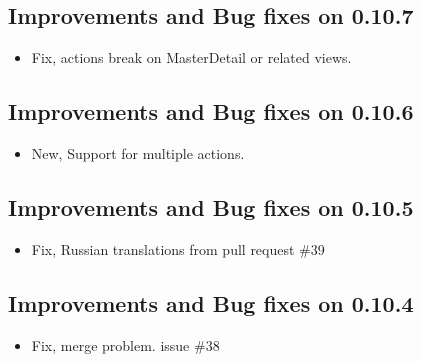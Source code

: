 \documentclass[letterpaper,10pt,english]{sphinxmanual}
\begin{document}
\subsection{Improvements and Bug fixes on 0.10.7}
\label{versions:improvements-and-bug-fixes-on-0-10-7}\begin{itemize}
\item {} 
Fix, actions break on MasterDetail or related views.

\end{itemize}


\subsection{Improvements and Bug fixes on 0.10.6}
\label{versions:improvements-and-bug-fixes-on-0-10-6}\begin{itemize}
\item {} 
New, Support for multiple actions.

\end{itemize}


\subsection{Improvements and Bug fixes on 0.10.5}
\label{versions:improvements-and-bug-fixes-on-0-10-5}\begin{itemize}
\item {} 
Fix, Russian translations from pull request \#39

\end{itemize}


\subsection{Improvements and Bug fixes on 0.10.4}
\label{versions:improvements-and-bug-fixes-on-0-10-4}\begin{itemize}
\item {} 
Fix, merge problem. issue \#38

\end{itemize}
\end{document}
